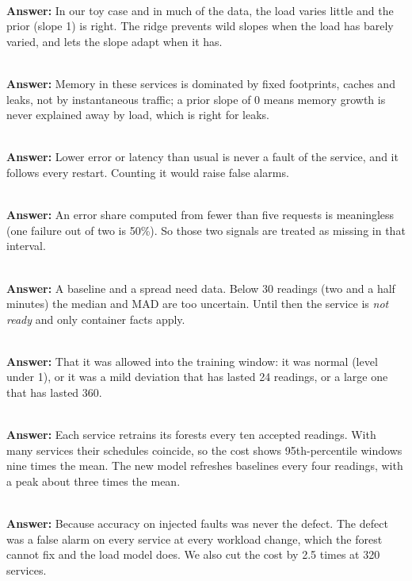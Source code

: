 \\
\textbf{Answer:} In our toy case and in much of the data, the load varies little and the prior (slope 1) is right. The ridge prevents wild slopes when the load has barely varied, and lets the slope adapt when it has.

\\
\textbf{Answer:} Memory in these services is dominated by fixed footprints, caches and leaks, not by instantaneous traffic; a prior slope of 0 means memory growth is never explained away by load, which is right for leaks.

\\
\textbf{Answer:} Lower error or latency than usual is never a fault of the service, and it follows every restart. Counting it would raise false alarms.

\\
\textbf{Answer:} An error share computed from fewer than five requests is meaningless (one failure out of two is 50\%). So those two signals are treated as missing in that interval.

\\
\textbf{Answer:} A baseline and a spread need data. Below 30 readings (two and a half minutes) the median and MAD are too uncertain. Until then the service is \emph{not ready} and only container facts apply.

\\
\textbf{Answer:} That it was allowed into the training window: it was normal (level under 1), or it was a mild deviation that has lasted 24 readings, or a large one that has lasted 360.

\\
\textbf{Answer:} Each service retrains its forests every ten accepted readings. With many services their schedules coincide, so the cost shows 95th-percentile windows nine times the mean. The new model refreshes baselines every four readings, with a peak about three times the mean.

\\
\textbf{Answer:} Because accuracy on injected faults was never the defect. The defect was a false alarm on every service at every workload change, which the forest cannot fix and the load model does. We also cut the cost by 2.5 times at 320 services.

